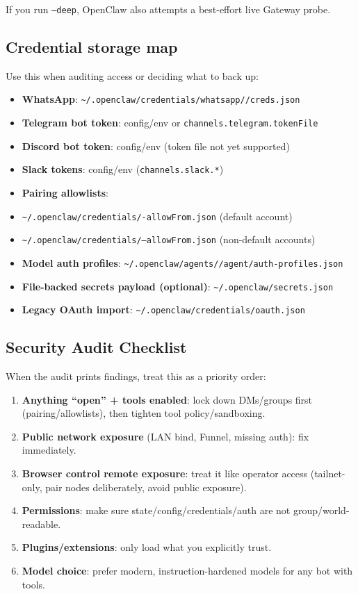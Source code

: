 If you run \texttt{--deep}, OpenClaw also attempts a best-effort live Gateway probe.

\subsection{Credential storage map}


Use this when auditing access or deciding what to back up:

\begin{itemize}
  \item \textbf{WhatsApp}: \texttt{\textasciitilde{}/.openclaw/credentials/whatsapp//creds.json}
  \item \textbf{Telegram bot token}: config/env or \texttt{channels.telegram.tokenFile}
  \item \textbf{Discord bot token}: config/env (token file not yet supported)
  \item \textbf{Slack tokens}: config/env (\texttt{channels.slack.*})
  \item \textbf{Pairing allowlists}:
  \item \texttt{\textasciitilde{}/.openclaw/credentials/-allowFrom.json} (default account)
  \item \texttt{\textasciitilde{}/.openclaw/credentials/--allowFrom.json} (non-default accounts)
  \item \textbf{Model auth profiles}: \texttt{\textasciitilde{}/.openclaw/agents//agent/auth-profiles.json}
  \item \textbf{File-backed secrets payload (optional)}: \texttt{\textasciitilde{}/.openclaw/secrets.json}
  \item \textbf{Legacy OAuth import}: \texttt{\textasciitilde{}/.openclaw/credentials/oauth.json}
\end{itemize}


\subsection{Security Audit Checklist}


When the audit prints findings, treat this as a priority order:

\begin{enumerate}
  \item \textbf{Anything “open” + tools enabled}: lock down DMs/groups first (pairing/allowlists), then tighten tool policy/sandboxing.
  \item \textbf{Public network exposure} (LAN bind, Funnel, missing auth): fix immediately.
  \item \textbf{Browser control remote exposure}: treat it like operator access (tailnet-only, pair nodes deliberately, avoid public exposure).
  \item \textbf{Permissions}: make sure state/config/credentials/auth are not group/world-readable.
  \item \textbf{Plugins/extensions}: only load what you explicitly trust.
  \item \textbf{Model choice}: prefer modern, instruction-hardened models for any bot with tools.
\end{enumerate}


